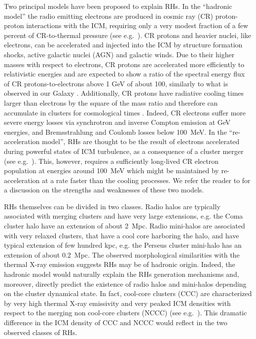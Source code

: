 \documentclass[traditabstract]{aa}
\begin{document}
Two principal models have been proposed to explain RHs.  In the ``hadronic model'' the radio emitting electrons are produced in cosmic ray (CR) proton-proton
interactions with the ICM, requiring only a very modest fraction of a few percent of CR-to-thermal pressure (see e.g.~\citealp{1997ApJ...477..560E, 
2001ApJ...559...59M,2003A&A...407L..73P, 2004A&A...413...17P, 2004MNRAS.352...76P, 2007IJMPA..22..681B, 2008MNRAS.385.1211P, 2008MNRAS.385.1242P, 2009JCAP...09..024K, 2010MNRAS.401...47D, 2010arXiv1003.0336D, 2010arXiv1003.1133K, 2010arXiv1011.0729K, 2011A&A...527A..99E}).  
CR protons and heavier nuclei, like electrons, can be accelerated and injected into the ICM by structure formation shocks, active 
galactic nuclei (AGN) and galactic winds.  Due to their higher masses with respect to electrons, CR protons are accelerated more efficiently to
relativistic energies and are expected to show a ratio of the spectral energy flux of CR protons-to-electrons above 1 GeV of about 100, similarly to
what is observed in our Galaxy \citep{2002cra..book.....S}. Additionally, CR protons have radiative cooling times larger than electrons by the square
of the mass ratio and therefore can accumulate in clusters for cosmological times \citep{1996SSRv...75..279V}. Indeed, CR electrons suffer more 
severe energy losses via synchrotron and inverse Compton emission at GeV energies, and Bremsstrahlung and Coulomb losses below 100~MeV.
In the ``re-acceleration model'', RHs are thought to be the result of electrons accelerated during powerful states of ICM turbulence, as a consequence of
a cluster merger (see e.g.~\citealp{1993ApJ...406..399G, 2002A&A...386..456G, 2005MNRAS.363.1173B, 2007MNRAS.378..245B,
2010arXiv1008.0184B, 2009A&A...507..661B}). This, however, requires a sufficiently long-lived CR electron 
population at energies around 100~MeV which might be maintained by re-acceleration at a rate faster than the cooling processes.  We refer the reader
to \citet{2011A&A...527A..99E} for a discussion on the strengths and weaknesses of these two models.

RHs themselves can be divided in two classes. Radio halos are typically associated with merging clusters and have very large extensions, e.g. the 
Coma cluster halo have an extension of about  2~Mpc. Radio mini-halos are associated with very relaxed clusters, that have a cool core
harboring the halo, and have typical extension of few hundred kpc, e.g. the Perseus cluster mini-halo has an extension of about 0.2~Mpc. 
The observed morphological similarities with the thermal X-ray emission suggests RHs may be of hadronic origin. Indeed, the hadronic model 
would naturally explain the RHs generation mechanisms and, moreover, directly predict the existence of radio halos and mini-halos depending 
on the cluster dynamical state. In fact, cool-core clusters (CCC) are characterized by very high thermal X-ray emissivity and very peaked ICM 
densities with respect to the merging non cool-core clusters (NCCC) (see e.g.~\citealp{2008A&A...487..431C}). This dramatic difference in 
the ICM density of CCC and NCCC would reflect in the two observed classes of RHs. 
\end{document}

